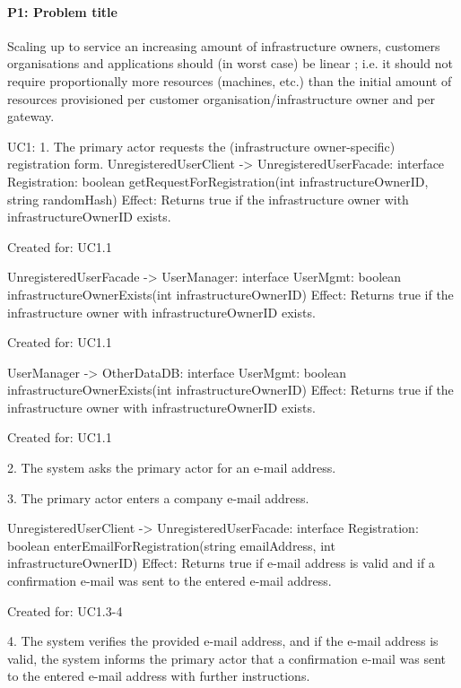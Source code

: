     \paragraph{P1: Problem title}
        Scaling up to service an increasing amount of infrastructure owners,
        customers organisations and applications should (in worst case) be linear ;
        i.e. it should not require proportionally more resources (machines, etc.)
        than the initial amount of resources provisioned per customer
        organisation/infrastructure owner and per gateway.


    UC1:
        1. The primary actor requests the (infrastructure owner-specific) registration form.
            UnregisteredUserClient -> UnregisteredUserFacade: interface Registration: boolean getRequestForRegistration(int infrastructureOwnerID, string randomHash)
                Effect: Returns true if the infrastructure owner with infrastructureOwnerID exists.
                \item Created for: UC1.1

            UnregisteredUserFacade -> UserManager: interface UserMgmt: boolean infrastructureOwnerExists(int infrastructureOwnerID)
                Effect: Returns true if the infrastructure owner with infrastructureOwnerID exists.
                \item Created for: UC1.1

            UserManager -> OtherDataDB: interface UserMgmt: boolean infrastructureOwnerExists(int infrastructureOwnerID)
                Effect: Returns true if the infrastructure owner with infrastructureOwnerID exists.
                \item Created for: UC1.1

        2. The system asks the primary actor for an e-mail address.

        3. The primary actor enters a company e-mail address.

            UnregisteredUserClient -> UnregisteredUserFacade: interface Registration: boolean enterEmailForRegistration(string emailAddress, int infrastructureOwnerID)
                Effect: Returns true if e-mail address is valid and if a confirmation e-mail was sent to the entered e-mail address.
                \item Created for: UC1.3-4

        4. The system verifies the provided e-mail address, and if the e-mail address is valid, the system
           informs the primary actor that a confirmation e-mail was sent to the entered e-mail address
           with further instructions.

